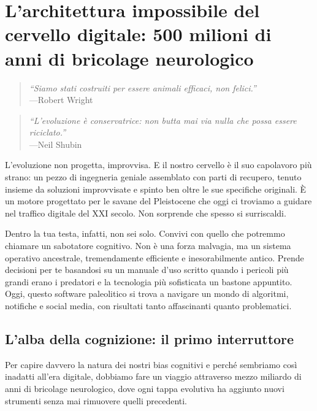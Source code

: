 \chapter{L'architettura impossibile del cervello digitale: 500 milioni di anni di bricolage neurologico}

\begin{quote}
\textit{``Siamo stati costruiti per essere animali efficaci, non felici.''}\\
\hspace*{\fill}---Robert Wright
\end{quote}

\begin{quote}
\textit{``L'evoluzione è conservatrice: non butta mai via nulla che possa essere riciclato.''}\\
\hspace*{\fill}---Neil Shubin
\end{quote}

L'evoluzione non progetta, improvvisa. E il nostro cervello è il suo capolavoro più strano: un pezzo di ingegneria geniale assemblato con parti di recupero, tenuto insieme da soluzioni improvvisate e spinto ben oltre le sue specifiche originali. È un motore progettato per le savane del Pleistocene che oggi ci troviamo a guidare nel traffico digitale del XXI secolo. Non sorprende che spesso si surriscaldi.

Dentro la tua testa, infatti, non sei solo. Convivi con quello che potremmo chiamare un sabotatore cognitivo. Non è una forza malvagia, ma un sistema operativo ancestrale, tremendamente efficiente e inesorabilmente antico. Prende decisioni per te basandosi su un manuale d'uso scritto quando i pericoli più grandi erano i predatori e la tecnologia più sofisticata un bastone appuntito. Oggi, questo software paleolitico si trova a navigare un mondo di algoritmi, notifiche e social media, con risultati tanto affascinanti quanto problematici.

\section{L'alba della cognizione: il primo interruttore}

Per capire davvero la natura dei nostri bias cognitivi e perché sembriamo così inadatti all'era digitale, dobbiamo fare un viaggio attraverso mezzo miliardo di anni di bricolage neurologico, dove ogni tappa evolutiva ha aggiunto nuovi strumenti senza mai rimuovere quelli precedenti.

